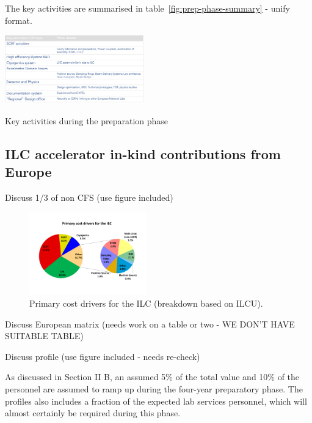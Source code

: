 \documentclass[%
 reprint,
 amsmath,amssymb,
 aps,
]{revtex4-1}
\begin{document}
The key activities are summarised in table~\ref{fig:prep-phase-summary} - unify format.


\begin{table}[htbp]
\includegraphics[width=0.45\textwidth]{figures/prep-phase-summary.pdf}
\caption{\label{fig:prep-phase-summary} Key activities during the preparation phase}
\end{table}


\subsection{ILC accelerator in-kind contributions from Europe ~\label{sec:constrphase:accelerator}}

Discuss 1/3 of non CFS (use figure included) 

\begin{figure}[htbp]
\begin{center}
\includegraphics[width=0.45\textwidth]{figures/eap-chp3-ilccostdrivers.pdf}
 \caption{\label{fig:constructionmodel:ILCPrimaryCostDrivers} Primary cost drivers for the ILC (breakdown based on ILCU).}
\end{center}
\end{figure}
Discuss European matrix (needs work on a table or two - WE DON'T HAVE SUITABLE TABLE) 

Discuss profile (use figure included - needs re-check)

As discussed in Section II B, an assumed 5\% of the total value and 10\% of the personnel are assumed
to ramp up during the four-year preparatory phase. The profiles also includes a fraction
of the expected lab services personnel, which will almost certainly be required during this
phase. 
\end{document}
